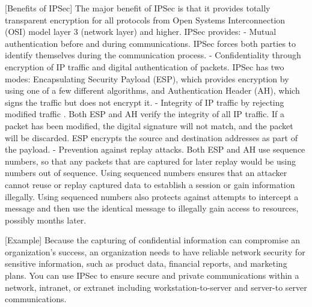 \documentclass[conference, compsoc]{IEEEtran}
\begin{document}
	[Benefits of IPSec]
The major benefit of IPSec is that it provides totally transparent encryption for all protocols from Open Systems Interconnection (OSI) model layer 3 (network layer) and higher.
		IPSec provides:
    - Mutual authentication before and during communications. 
	        IPSec forces both parties to identify themselves during the communication process.
   - Confidentiality through encryption of IP traffic and digital authentication of packets.
	        IPSec has two modes: Encapsulating Security Payload (ESP), which provides encryption by using one of a few different algorithms, and Authentication Header (AH), which signs the traffic but does not encrypt it.
    - Integrity of IP traffic by rejecting modified traffic .
	        Both ESP and AH verify the integrity of all IP traffic. If a packet has been modified, the digital signature will not match, and the packet will be discarded. ESP encrypts the source and destination addresses as part of the payload.
    - Prevention against replay attacks.
	        Both ESP and AH use sequence numbers, so that any packets that are captured for later replay would be using numbers out of sequence. Using sequenced numbers ensures that an attacker cannot reuse or replay captured data to establish a session or gain information illegally. Using sequenced numbers also protects against attempts to intercept a message and then use the identical message to illegally gain access to resources, possibly months later.

	[Example]
Because the capturing of confidential information can compromise an organization’s success, an organization needs to have reliable network security for sensitive information, such as product data, financial reports, and marketing plans. You can use IPSec to ensure secure and private communications within a network, intranet, or extranet including workstation-to-server and server-to server communications.
\end{document}
